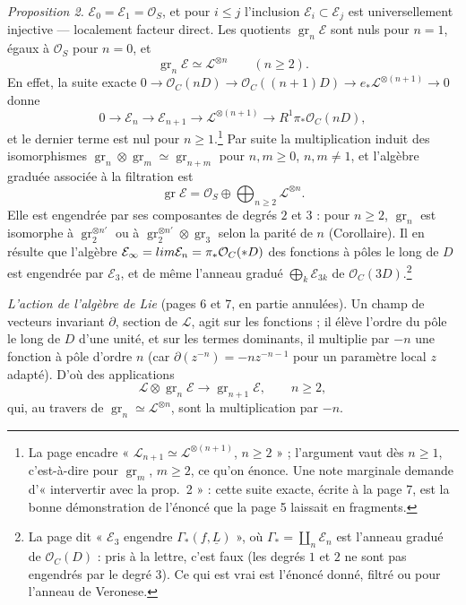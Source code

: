 \documentclass[11pt,a4paper]{article}
\begin{document}
\emph{Proposition 2.} $\mathcal{E}_0 = \mathcal{E}_1 = \mathcal{O}_S$, et pour
$i \leqslant j$ l'inclusion $\mathcal{E}_i \subset \mathcal{E}_j$ est
universellement injective --- localement facteur direct. Les quotients
$\operatorname{gr}_n\mathcal{E}$ sont nuls pour $n = 1$, égaux à
$\mathcal{O}_S$ pour $n = 0$, et
\[
\operatorname{gr}_n\mathcal{E} \simeq \mathcal{L}^{\otimes n}
\qquad (n \geqslant 2).
\]
En effet, la suite exacte $0 \to \mathcal{O}_C(nD) \to \mathcal{O}_C((n+1)D)
\to e_*\mathcal{L}^{\otimes(n+1)} \to 0$ donne
\[
0 \to \mathcal{E}_n \to \mathcal{E}_{n+1} \to \mathcal{L}^{\otimes(n+1)} \to
R^1\pi_*\mathcal{O}_C(nD),
\]
et le dernier terme est nul pour $n \geqslant 1$.\footnote{La page encadre
« $\mathcal{L}_{n+1} \simeq \mathcal{L}^{\otimes(n+1)}$, $n \geqslant 2$ » ;
l'argument vaut dès $n \geqslant 1$, c'est-à-dire pour $\operatorname{gr}_m$,
$m \geqslant 2$, ce qu'on énonce. Une note marginale demande d'« intervertir
avec la prop.\ 2 » : cette suite exacte, écrite à la page 7, est la bonne
démonstration de l'énoncé que la page 5 laissait en fragments.} Par suite la
multiplication induit des isomorphismes $\operatorname{gr}_n \otimes
\operatorname{gr}_m \simeq \operatorname{gr}_{n+m}$ pour $n, m \geqslant 0$,
$n, m \neq 1$, et l'algèbre graduée associée à la filtration est
\[
\operatorname{gr}\mathcal{E} = \mathcal{O}_S \oplus \bigoplus_{n \geqslant 2}
\mathcal{L}^{\otimes n}.
\]
Elle est engendrée par ses composantes de degrés $2$ et $3$ : pour $n
\geqslant 2$, $\operatorname{gr}_n$ est isomorphe à
$\operatorname{gr}_2^{\otimes n'}$ ou à $\operatorname{gr}_2^{\otimes n'}
\otimes \operatorname{gr}_3$ selon la parité de $n$ (Corollaire). Il en résulte
que l'algèbre $\mathcal{E}_\infty = \varinjlim \mathcal{E}_n =
\pi_*\mathcal{O}_C(*D)$ des fonctions à pôles le long de $D$ est engendrée par
$\mathcal{E}_3$, et de même l'anneau gradué $\bigoplus_k \mathcal{E}_{3k}$ de
$\mathcal{O}_C(3D)$.\footnote{La page dit « $\mathcal{E}_3$ engendre
$\Gamma_*(f, \underline{L})$ », où $\Gamma_* = \coprod_n \mathcal{E}_n$ est
l'anneau gradué de $\mathcal{O}_C(D)$ : pris à la lettre, c'est faux (les
degrés $1$ et $2$ ne sont pas engendrés par le degré $3$). Ce qui est vrai est
l'énoncé donné, filtré ou pour l'anneau de Veronese.}

\emph{L'action de l'algèbre de Lie} (pages 6 et 7, en partie annulées). Un
champ de vecteurs invariant $\partial$, section de $\mathcal{L}$, agit sur les
fonctions ; il élève l'ordre du pôle le long de $D$ d'une unité, et sur les
termes dominants, il multiplie par $-n$ une fonction à pôle d'ordre $n$
(car $\partial(z^{-n}) = -nz^{-n-1}$ pour un paramètre local $z$ adapté). D'où
des applications
\[
\mathcal{L} \otimes \operatorname{gr}_n\mathcal{E} \to
\operatorname{gr}_{n+1}\mathcal{E}, \qquad n \geqslant 2,
\]
qui, au travers de $\operatorname{gr}_n \simeq \mathcal{L}^{\otimes n}$, sont la
multiplication par $-n$.
\end{document}

